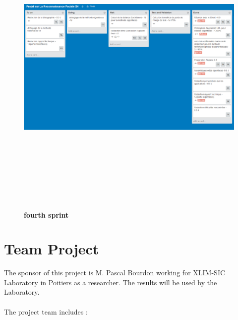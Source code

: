 \begin{itemize}
\begin{figure}[bth]
\begin{center}
\includegraphics[scale=0.60,height=15cm,width=17cm]{sprint4}
\caption{\textbf{fourth sprint }}%
\end {center}
\end{figure}


\end{itemize}

\clearpage
\section{Team Project}

The sponsor of this project is M. Pascal Bourdon working for XLIM-SIC Laboratory in Poitiers as a researcher. The results will be used by the Laboratory.
\paragraph{}
The project team includes :

